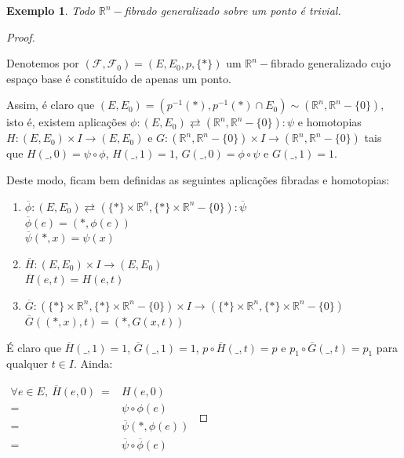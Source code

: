 \documentclass[12pt,oneside]{book} %
\newtheorem{ex}     {\hspace{0.5cm}Exemplo}[chapter]
\newcommand{\R}{\mathbb{R}}
\begin{document}
\begin{ex}\label{fht_sobre_ponto}
	Todo $\R^{n}-$fibrado generalizado sobre um ponto é trivial.
\end{ex}
\begin{proof}
	
	\
	
	\par Denotemos por $(\mathcal{F},\mathcal{F}_{0})=(E,E_{0},p,\{ * \})$ um $\R^{n}-$fibrado generalizado cujo espaço base é constituído de apenas um ponto.
	
	\par Assim, é claro que $(E,E_{0})=(p^{-1}(*),p^{-1}(*)\cap E_{0})\sim (\R^{n},\R^{n}-\{0 \})$, isto é, existem aplicações $\phi:(E,E_{0})\rightleftarrows (\R^{n},\R^{n}-\{ 0 \}):\psi$ e homotopias $H:(E,E_{0})\times I\to (E,E_{0})$ e $G:(\R^{n},\R^{n}-\{0 \})\times I\to (\R^{n},\R^{n}-\{0 \})$ tais que $H(\_,0)=\psi\circ\phi$, $H(\_,1)=1$, $G(\_,0)=\phi\circ\psi$ e $G(\_,1)=1$.
	
	\par Deste modo, ficam bem definidas as seguintes aplicações fibradas e homotopias:
	
	\begin{enumerate}
		\item $\overline{\phi}:(E,E_{0})\rightleftarrows (\{ * \}\times\R^{n},\{ * \}\times\R^{n}-\{0 \}):\overline{\psi}$ \\
		$ \overline{\phi}(e)=(*,\phi(e)) $ \\
		$ \overline{\psi}(*,x)=\psi(x) $
		\item $\overline{H}:(E,E_{0})\times I\to (E,E_{0})$ \\
		$ \overline{H}(e,t)=H(e,t) $
		\item $\overline{G}:(\{ * \}\times\R^{n},\{ * \}\times\R^{n}-\{0 \})\times I \to (\{ * \}\times\R^{n},\{ * \}\times\R^{n}-\{0 \})$ \\
		$ \overline{G}((*,x),t)=(*,G(x,t)) $
	\end{enumerate}
	
	\par É claro que $\overline{H}(\_,1)=1$, $\overline{G}(\_,1)=1$, $p\circ\overline{H}(\_,t)=p$ e $p_{1}\circ\overline{G}(\_,t)=p_{1}$ para qualquer $t\in I$. Ainda: \newline 
	
	$\begin{array}{rl}
		\forall e\in E, \ \overline{H}(e,0) \ = & H(e,0) \\
		= & \psi\circ\phi(e) \\
		= & \overline{\psi}(*,\phi(e)) \\
		= & \overline{\psi}\circ\overline{\phi}(e)
	\end{array}$
	

\end{proof}
\end{document}
